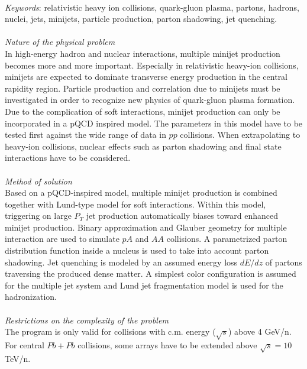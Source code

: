 \vspace{0pt}\\
{\em Keywords}: relativistic heavy ion collisions, quark-gluon plasma,
partons, hadrons, nuclei, jets, minijets, particle production, 
parton shadowing, jet quenching.\\
\vspace{0pt}\\
{\em Nature of the physical problem}\\
In high-energy hadron and nuclear interactions, multiple minijet
production becomes more and more important. Especially in relativistic
heavy-ion collisions, minijets are expected to dominate transverse
energy production in the central rapidity region. Particle production
and correlation due to minijets must be investigated in order to
recognize new physics of quark-gluon plasma formation. 
Due to the complication of soft interactions, 
minijet production can only be incorporated in a pQCD
inspired model. The parameters in this model have to be tested first
against the wide range of data in $pp$ collisions. When extrapolating
to heavy-ion collisions, nuclear effects such as parton shadowing and
final state interactions have to be considered.\\
\vspace{0pt}\\
{\em Method of solution}\\
        Based on a pQCD-inspired model, multiple minijet production
is combined together with Lund-type model for soft interactions. Within
this model, triggering on large $P_T$ jet production automatically
biases toward enhanced minijet production. Binary approximation and Glauber 
geometry for multiple interaction are used to simulate $pA$ and $AA$
collisions. A parametrized parton distribution function inside
a nucleus is used to take into account parton shadowing. Jet quenching
is modeled by an assumed energy loss $dE/dz$ of partons traversing
the produced dense matter. A simplest color configuration is assumed
for the multiple jet system and Lund jet fragmentation model is used
for the hadronization.\\
\vspace{0pt}\\
{\em Restrictions on the complexity of the problem}\\
        The program is only valid for collisions with c.m.
energy ($\sqrt{s}$) above 4 GeV/n. For central $Pb+Pb$ collisions, 
some arrays have to be extended above $\sqrt{s}=10$ TeV/n.\\

